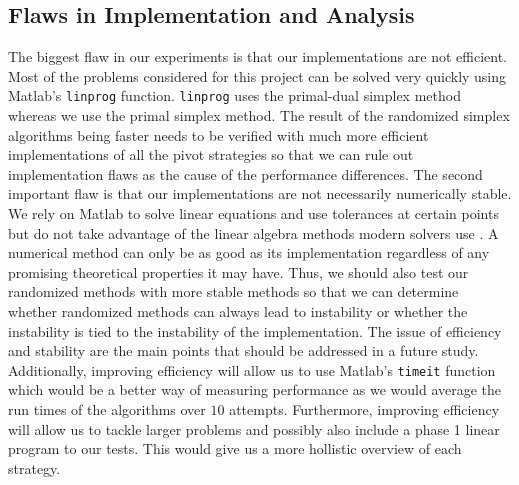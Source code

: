 \documentclass{standalone}
\begin{document}
  \subsection{Flaws in Implementation and Analysis}
  The biggest flaw in our experiments is that our implementations are not efficient. Most of the problems considered for this project can be solved very quickly using Matlab's \verb|linprog| function. \verb|linprog| uses the primal-dual simplex method whereas we use the primal simplex method. The result of the randomized simplex algorithms being faster needs to be verified with much more efficient implementations of all the pivot strategies so that we can rule out implementation flaws as the cause of the performance differences. The second important flaw is that our implementations are not necessarily numerically stable. We rely on Matlab to solve linear equations and use tolerances at certain points but do not take advantage of the linear algebra methods modern solvers use \cite{bixby2002solving}. A numerical method can only be as good as its implementation regardless of any promising theoretical properties it may have. Thus, we should also test our randomized methods with more stable methods so that we can determine whether randomized methods can always lead to instability or whether the instability is tied to the instability of the implementation. The issue of efficiency and stability are the main points that should be addressed in a future study. Additionally, improving efficiency will allow us to use Matlab's \verb|timeit| function which would be a better way of measuring performance as we would average the run times of the algorithms over $10$ attempts. Furthermore, improving efficiency will allow us to tackle larger problems and possibly also include a phase 1 linear program to our tests. This would give us a more hollistic overview of each strategy.\par
\end{document}

